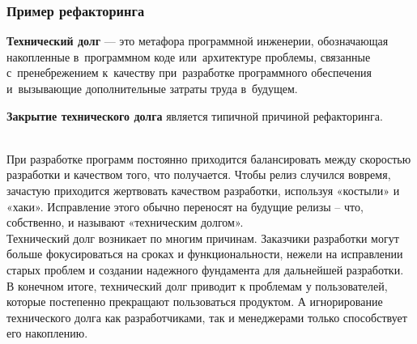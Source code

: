 \documentclass{../industrial-development}
\begin{document}
\begin{frame} \frametitle{Пример рефакторинга}
\textbf{Технический долг} --- это метафора программной инженерии, обозначающая накопленные в~программном коде или~архитектуре проблемы, связанные с~пренебрежением к~качеству при~разработке программного обеспечения и~вызывающие дополнительные затраты труда в~будущем.
 
\textbf{Закрытие технического долга} является типичной причиной рефакторинга. 
\end{frame}
\\При разработке программ постоянно приходится балансировать между скоростью разработки и качеством того, что получается. Чтобы релиз случился вовремя, зачастую приходится жертвовать качеством разработки, используя «костыли» и «хаки». Исправление этого обычно переносят на будущие релизы – что, собственно, и называют «техническим долгом».\\
Технический долг возникает по многим причинам. Заказчики разработки могут больше фокусироваться на сроках и функциональности, нежели на исправлении старых проблем и создании надежного фундамента для дальнейшей разработки.\\
В конечном итоге, технический долг приводит к проблемам у пользователей, которые постепенно прекращают пользоваться продуктом. А игнорирование технического долга как разработчиками, так и менеджерами только способствует его накоплению.
\end{document}

